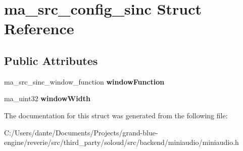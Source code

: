 \hypertarget{structma__src__config__sinc}{}\section{ma\+\_\+src\+\_\+config\+\_\+sinc Struct Reference}
\label{structma__src__config__sinc}
\subsection*{Public Attributes}
\begin{DoxyCompactItemize}
\item 
\mbox{\label{structma__src__config__sinc_a6f47df3e6660355110aaa45b3cf144ff}} 
ma\+\_\+src\+\_\+sinc\+\_\+window\+\_\+function {\bfseries window\+Function}
\item 
\mbox{\label{structma__src__config__sinc_af1e499a4f7021623a050b016086b1541}} 
ma\+\_\+uint32 {\bfseries window\+Width}
\end{DoxyCompactItemize}


The documentation for this struct was generated from the following file\+:\begin{DoxyCompactItemize}
\item 
C\+:/\+Users/dante/\+Documents/\+Projects/grand-\/blue-\/engine/reverie/src/third\+\_\+party/soloud/src/backend/miniaudio/miniaudio.\+h\end{DoxyCompactItemize}
